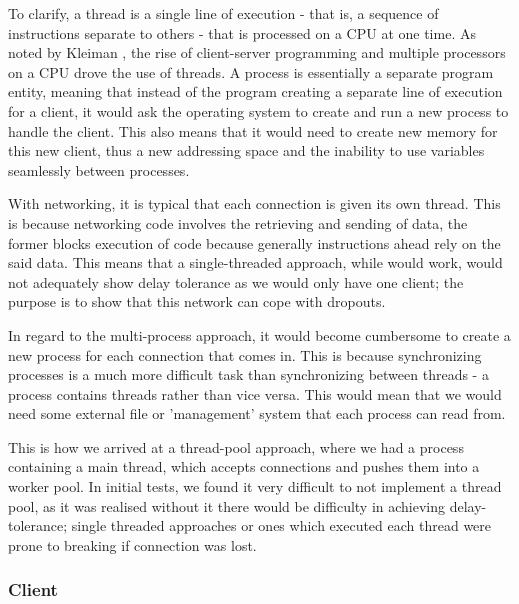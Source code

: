 \documentclass[11pt]{article}
\begin{document}
To clarify, a thread is a single line of execution - that is, a sequence of instructions separate to others - that is processed on a CPU at one time. As noted by Kleiman \cite{client_server}, the rise of client-server programming and multiple processors on a CPU drove the use of threads. A process is essentially a separate program entity, meaning that instead of the program creating a separate line of execution for a client, it would ask the operating system to create and run a new process to handle the client. This also means that it would need to create new memory for this new client, thus a new addressing space and the inability to use variables seamlessly between processes. 

With networking, it is typical that each connection is given its own thread. This is because networking code involves the retrieving and sending of data, the former blocks execution of code because generally instructions ahead rely on the said data. This means that a single-threaded approach, while would work, would not adequately show delay tolerance as we would only have one client; the purpose is to show that this network can cope with dropouts.

In regard to the multi-process approach, it would become cumbersome to create a new process for each connection that comes in. This is because synchronizing processes is a much more difficult task than synchronizing between threads - a process contains threads rather than vice versa. This would mean that we would need some external file or 'management' system that each process can read from. 


This is how we arrived at a thread-pool approach, where we had a process containing a main thread, which accepts connections and pushes them into a worker pool. In initial tests, we found it very difficult to not implement a thread pool, as it was realised without it there would be difficulty in achieving delay-tolerance; single threaded approaches or ones which executed each thread were prone to breaking if connection was lost. 






\subsubsection{Client}
\end{document}
